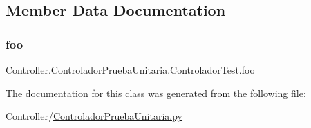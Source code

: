 \subsection{Member Data Documentation}
\mbox{\label{class_controller_1_1_controlador_prueba_unitaria_1_1_controlador_test_a2f176dc83cda878c82e90b5eed2c321a}} 
\subsubsection{\texorpdfstring{foo}{foo}}
{\footnotesize\ttfamily Controller.\+Controlador\+Prueba\+Unitaria.\+Controlador\+Test.\+foo}



The documentation for this class was generated from the following file\+:\begin{DoxyCompactItemize}
\item 
Controller/\hyperlink{_controlador_prueba_unitaria_8py}{Controlador\+Prueba\+Unitaria.\+py}\end{DoxyCompactItemize}
